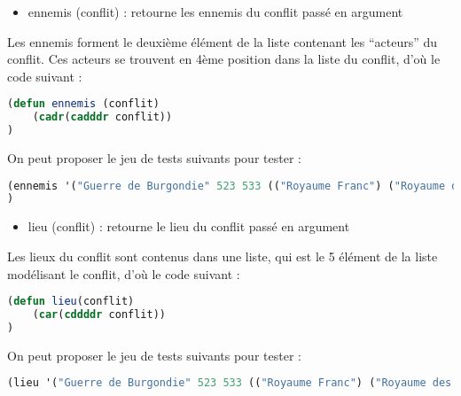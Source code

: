 \documentclass[a4paper, 12pt]{article}
\begin{document}
\begin{itemize}[label=\textbullet]
    \item ennemis (conflit) : retourne les ennemis du conflit passé en argument
    \end{itemize}
\vspace{3mm}

Les ennemis forment le deuxième élément de la liste contenant les “acteurs” du conflit. Ces acteurs se trouvent en 4ème position dans la liste du conflit, d’où le code suivant :
\vspace{2mm}

\begin{lstlisting}[language=Lisp]
(defun ennemis (conflit)
    (cadr(cadddr conflit))
)\end{lstlisting}
\vspace{2mm}

On peut proposer le jeu de tests suivants pour tester :
\vspace{2mm}

\begin{lstlisting}[language=Lisp]
(ennemis '("Guerre de Burgondie" 523 533 (("Royaume Franc") ("Royaume des Burgondes")) ("Vezeronce" "Arles"))) ; renvoie ("Royaume des Burgondes")
)\end{lstlisting}
\vspace{5mm}

\begin{itemize}[label=\textbullet]
\item lieu (conflit) : retourne le lieu du conflit passé en argument
\end{itemize}
\vspace{3mm}

Les lieux du conflit sont contenus dans une liste, qui est le 5 élément de la liste modélisant le conflit, d’où le code suivant :
\vspace{2mm}

\begin{lstlisting}[language=Lisp]
(defun lieu(conflit)
    (car(cddddr conflit))
)
\end{lstlisting}
\vspace{2mm}

On peut proposer le jeu de tests suivants pour tester :
\vspace{2mm}

\begin{lstlisting}[language=Lisp]
(lieu '("Guerre de Burgondie" 523 533 (("Royaume Franc") ("Royaume des Burgondes")) ("Vezeronce" "Arles"))) ; renvoie ("Vezeronce" "Arles")
\end{lstlisting}
\vspace{5mm}
\end{document}
